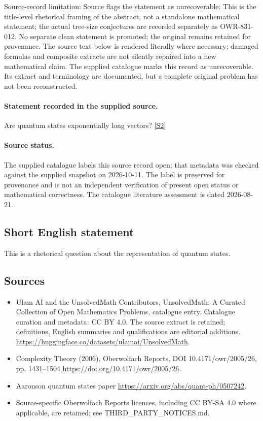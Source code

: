 \documentclass[11pt]{article}
\begin{document}
Source-record limitation: Source flags the statement as unrecoverable: This is the title-level rhetorical framing of the abstract, not a standalone mathematical statement; the actual tree-size conjectures are recorded separately as OWR-831-012. No separate clean statement is promoted; the original remains retained for provenance.
The source text below is rendered literally where necessary; damaged formulas and composite extracts are not silently repaired into a new mathematical claim.
The supplied catalogue marks this record as unrecoverable. Its extract and terminology are documented, but a complete original problem has not been reconstructed.
\paragraph{Statement recorded in the supplied source.}
Are quantum states exponentially long vectors? \href{https://doi.org/10.4171/owr/2005/26}{[S2]}
\paragraph{Source status.}
The supplied catalogue labels this source record open; that metadata was checked against the supplied snapshot on 2026-10-11. The label is preserved for provenance and is not an independent verification of present open status or mathematical correctness. The catalogue literature assessment is dated 2026-08-21.
\subsection{Short English statement}
This is a rhetorical question about the representation of quantum states.
\subsection{Sources}
\begin{itemize}
\item[S1] Ulam AI and the UnsolvedMath Contributors, UnsolvedMath: A Curated Collection of Open Mathematics Problems, catalogue entry. Catalogue curation and metadata: CC BY 4.0. The source extract is retained; definitions, English summaries and qualifications are editorial additions.
\url{https://huggingface.co/datasets/ulamai/UnsolvedMath}.
\item[S2] Complexity Theory (2006), Oberwolfach Reports, DOI 10.4171/owr/2005/26, pp. 1431--1504
\url{https://doi.org/10.4171/owr/2005/26}.
\item[S3] Aaronson quantum states paper
\url{https://arxiv.org/abs/quant-ph/0507242}.
\item Source-specific Oberwolfach Reports licences, including CC BY-SA 4.0 where applicable, are retained; see THIRD\_PARTY\_NOTICES.md.
\end{itemize}
\end{document}
